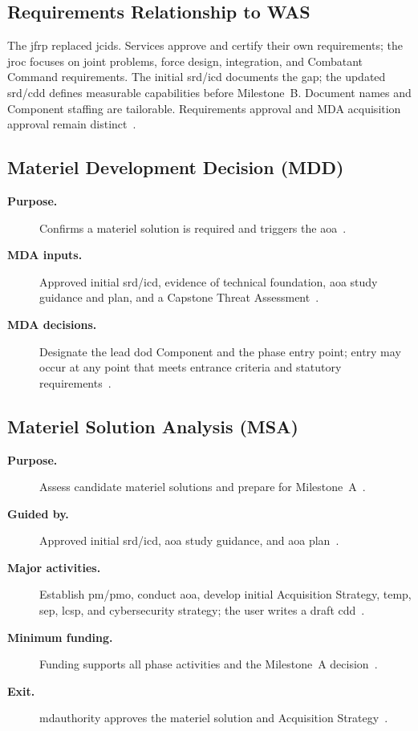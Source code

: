 \documentclass[../main.tex]{subfiles}
\begin{document}
\subsection{Requirements Relationship to WAS}
The \ac{jfrp} replaced \ac{jcids}. Services approve and certify their own requirements; the \ac{jroc} focuses on joint problems, force design, integration, and Combatant Command requirements. The initial \ac{srd}/\ac{icd} documents the gap; the updated \ac{srd}/\ac{cdd} defines measurable capabilities before Milestone~B. Document names and Component staffing are tailorable. Requirements approval and MDA acquisition approval remain distinct~\autocite{edo-3-3-3-jfrp-2026,edo-3-3-2-acq-milestones-phases-2025}.

\subsection{Materiel Development Decision (MDD)}
\begin{description}
  \item[\textbf{Purpose.}] Confirms a materiel solution is required and triggers the \ac{aoa}~\autocite{DoDI5000-85,edo-3-3-2-acq-milestones-phases-2025}.
  \item[\textbf{MDA inputs.}] Approved initial \ac{srd}/\ac{icd}, evidence of technical foundation, \ac{aoa} study guidance and plan, and a Capstone Threat Assessment~\autocite{DoDI5000-85,USC-10-4251,edo-3-3-2-acq-milestones-phases-2025}.
  \item[\textbf{MDA decisions.}] Designate the lead \ac{dod} Component and the phase entry point; entry may occur at any point that meets entrance criteria and statutory requirements~\autocite{DoDI5000-85,edo-3-3-2-acq-milestones-phases-2025}.
\end{description}

\subsection{Materiel Solution Analysis (MSA)}
\begin{description}
  \item[\textbf{Purpose.}] Assess candidate materiel solutions and prepare for Milestone~A~\autocite{DoDI5000-85,edo-3-3-2-acq-milestones-phases-2025}.
  \item[\textbf{Guided by.}] Approved initial \ac{srd}/\ac{icd}, \ac{aoa} study guidance, and \ac{aoa} plan~\autocite{DoDI5000-85,edo-3-3-2-acq-milestones-phases-2025}.
  \item[\textbf{Major activities.}] Establish \ac{pm}/\ac{pmo}, conduct \ac{aoa}, develop initial Acquisition Strategy, \ac{temp}, \ac{sep}, \ac{lcsp}, and cybersecurity strategy; the user writes a draft \ac{cdd}~\autocite{DoDI5000-85,edo-3-3-2-acq-milestones-phases-2025}.
  \item[\textbf{Minimum funding.}] Funding supports all phase activities and the Milestone~A decision~\autocite{edo-3-3-2-acq-milestones-phases-2025}.
  \item[\textbf{Exit.}] \ac{mdauthority} approves the materiel solution and Acquisition Strategy~\autocite{DoDI5000-85,edo-3-3-2-acq-milestones-phases-2025}.
\end{description}
\end{document}
